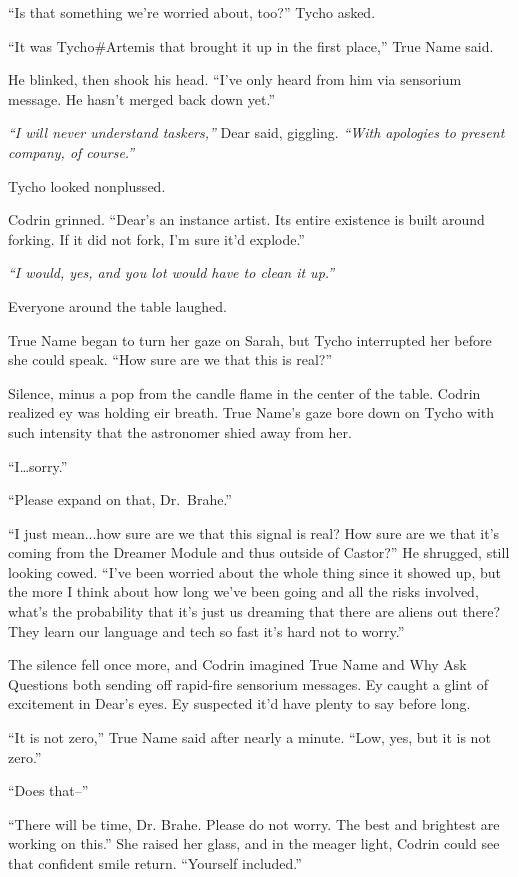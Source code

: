 ``Is that something we're worried about, too?'' Tycho asked.

``It was Tycho\#Artemis that brought it up in the first place,'' True Name said.

He blinked, then shook his head. ``I've only heard from him via sensorium message. He hasn't merged back down yet.''

\emph{``I will never understand taskers,''} Dear said, giggling. \emph{``With apologies to present company, of course.''}

Tycho looked nonplussed.

Codrin grinned. ``Dear's an instance artist. Its entire existence is built around forking. If it did not fork, I'm sure it'd explode.''

\emph{``I would, yes, and you lot would have to clean it up.''}

Everyone around the table laughed.

True Name began to turn her gaze on Sarah, but Tycho interrupted her before she could speak. ``How sure are we that this is real?''

Silence, minus a pop from the candle flame in the center of the table. Codrin realized ey was holding eir breath. True Name's gaze bore down on Tycho with such intensity that the astronomer shied away from her.

``I\ldots{}sorry.''

``Please expand on that, Dr.~Brahe.''

``I just mean...how sure are we that this signal is real? How sure are we that it's coming from the Dreamer Module and thus outside of Castor?'' He shrugged, still looking cowed. ``I've been worried about the whole thing since it showed up, but the more I think about how long we've been going and all the risks involved, what's the probability that it's just us dreaming that there are aliens out there? They learn our language and tech so fast it's hard not to worry.''

The silence fell once more, and Codrin imagined True Name and Why Ask Questions both sending off rapid-fire sensorium messages. Ey caught a glint of excitement in Dear's eyes. Ey suspected it'd have plenty to say before long.

``It is not zero,'' True Name said after nearly a minute. ``Low, yes, but it is not zero.''

``Does that--''

``There will be time, Dr. Brahe. Please do not worry. The best and brightest are working on this.'' She raised her glass, and in the meager light, Codrin could see that confident smile return. ``Yourself included.''

